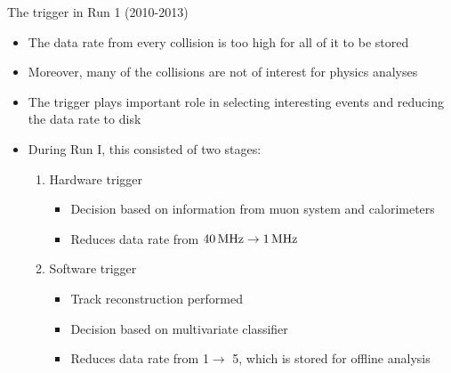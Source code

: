 \documentclass[aspectratio=1610]{beamer}
\begin{document}
\begin{frame}{The \lhcb trigger in Run 1 (2010-2013)}

\begin{itemize}
  \item The data rate from every \proton\proton collision is too high for all of it to be stored
  \item Moreover, many of the collisions are not of interest for physics analyses
  \item The \lhcb trigger plays important role in selecting interesting events and reducing the data rate to disk 
\end{itemize}

\begin{itemize}
 \item During Run I, this consisted of two stages:
 \begin{enumerate}
    \item Hardware trigger
    \begin{itemize}
      \item Decision based on information from muon system and calorimeters 
      \item Reduces data rate from $40{\mathrm{ \,MHz}}\rightarrow1{\mathrm{ \,MHz}}$
    \end{itemize}
    \item Software trigger 
    \begin{itemize}
      \item Track reconstruction performed
      \item Decision based on multivariate classifier
      \item Reduces data rate from 1\mhz $\rightarrow$ 5\khz, which is stored for offline analysis
    \end{itemize}
 \end{enumerate}
\end{itemize}

\end{frame}
\end{document}
